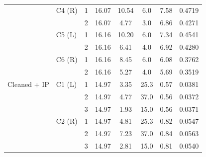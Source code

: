 {\begin{longtable}{llcccccc}
    \addlinespace[2pt]
     & C4 (R) & 1 & 16.07 & 10.54 & 6.0 & 7.58 & 0.4719 \\
     &  & 2 & 16.07 & 4.77 & 3.0 & 6.86 & 0.4271 \\
    \addlinespace[2pt]
     & C5 (L) & 1 & 16.16 & 10.20 & 6.0 & 7.34 & 0.4541 \\
     &  & 2 & 16.16 & 6.41 & 4.0 & 6.92 & 0.4280 \\
    \addlinespace[2pt]
     & C6 (R) & 1 & 16.16 & 8.45 & 6.0 & 6.08 & 0.3762 \\
     &  & 2 & 16.16 & 5.27 & 4.0 & 5.69 & 0.3519 \\
    \midrule
    Cleaned + IP & C1 (L) & 1 & 14.97 & 3.35 & 25.3 & 0.57 & 0.0381 \\
     &  & 2 & 14.97 & 4.77 & 37.0 & 0.56 & 0.0372 \\
     &  & 3 & 14.97 & 1.93 & 15.0 & 0.56 & 0.0371 \\
    \addlinespace[2pt]
     & C2 (R) & 1 & 14.97 & 4.81 & 25.3 & 0.82 & 0.0547 \\
     &  & 2 & 14.97 & 7.23 & 37.0 & 0.84 & 0.0563 \\
     &  & 3 & 14.97 & 2.81 & 15.0 & 0.81 & 0.0540 \\
  \bottomrule
\end{longtable}}

